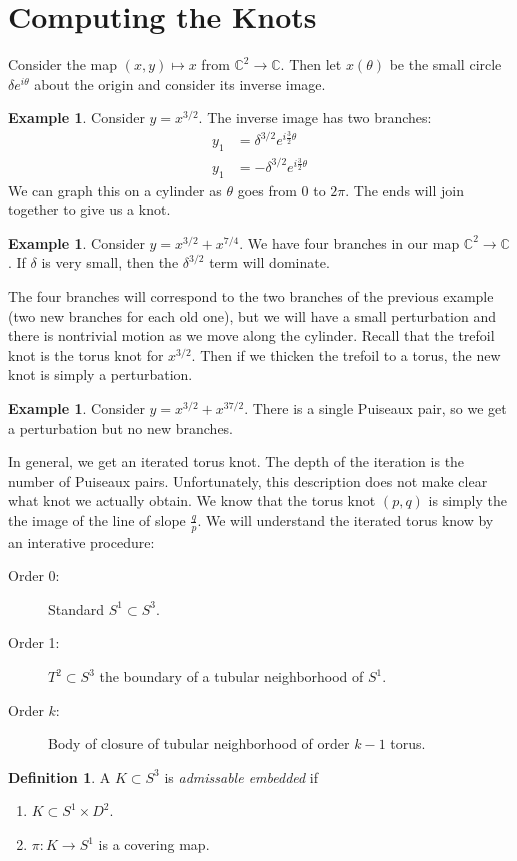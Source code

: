 \documentclass[leqno, openany]{memoir}
\theoremstyle{definition}
\newtheorem{defn}[thm]{Definition}
\newtheorem{exm}[thm]{Example}
\theoremstyle{remark}
\theoremstyle{plain}
\theoremstyle{definition}
\theoremstyle{remark}
\renewcommand{\C}{\mathbb{C}}
\begin{document}
\section{Computing the Knots}%
\label{sec:computing_the_knots}


Consider the map $(x,y) \mapsto x$ from $\C^2 \to \C$. Then let $x(\theta)$ be the small circle $\delta e^{i\theta}$ about the origin and consider its inverse image.

\begin{exm}
    Consider $y = x^{3/2}$. The inverse image has two branches:
    \begin{align*}
        y_1 &= \delta^{3/2}e^{i\frac{3}{2} \theta} \\
        y_1 &= - \delta^{3/2}e^{i\frac{3}{2} \theta}
    \end{align*}
    We can graph this on a cylinder as $\theta$ goes from $0$ to $2\pi$. The ends will join together to give us a knot.
\end{exm}

\begin{exm}
    Consider $y = x^{3/2} + x^{7/4}$. We have four branches in our map $\C^2 \to \C$. If $\delta$ is very small, then the $\delta^{3/2}$ term will dominate.

    The four branches will correspond to the two branches of the previous example (two new branches for each old one), but we will have a small perturbation and there is nontrivial motion as we move along the cylinder. Recall that the trefoil knot is the torus knot for $x^{3/2}$. Then if we thicken the trefoil to a torus, the new knot is simply a perturbation.
\end{exm}

\begin{exm}
    Consider $y = x^{3/2} + x^{37/2}$. There is a single Puiseaux pair, so we get a perturbation but no new branches.
\end{exm}

In general, we get an iterated torus knot. The depth of the iteration is the number of Puiseaux pairs. Unfortunately, this description does not make clear what knot we actually obtain. We know that the torus knot $(p,q)$ is simply the the image of the line of slope $\frac{q}{p}$. We will understand the iterated torus know by an interative procedure:
\begin{description}
    \item[Order 0:]Standard $S^1 \subset S^3$.
    \item[Order 1:]$T^2 \subset S^3$ the boundary of a tubular neighborhood of $S^1$.
    \item[Order $k$:]Body of closure of tubular neighborhood of order $k-1$ torus.
\end{description}
\begin{defn}
    A $K \subset S^3$ is \textit{admissable embedded} if 
    \begin{enumerate}
        \item $K \subset S^1 \times D^2$.
        \item $\pi: K \to S^1$ is a covering map.
    \end{enumerate}
\end{defn}
\end{document}
